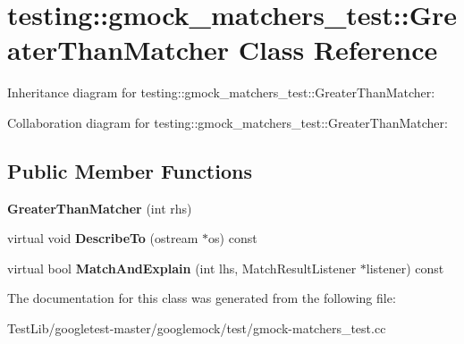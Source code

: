 \hypertarget{classtesting_1_1gmock__matchers__test_1_1GreaterThanMatcher}{}\section{testing\+:\+:gmock\+\_\+matchers\+\_\+test\+:\+:Greater\+Than\+Matcher Class Reference}
\label{classtesting_1_1gmock__matchers__test_1_1GreaterThanMatcher}


Inheritance diagram for testing\+:\+:gmock\+\_\+matchers\+\_\+test\+:\+:Greater\+Than\+Matcher\+:


Collaboration diagram for testing\+:\+:gmock\+\_\+matchers\+\_\+test\+:\+:Greater\+Than\+Matcher\+:
\subsection*{Public Member Functions}
\begin{DoxyCompactItemize}
\item 
\mbox{\label{classtesting_1_1gmock__matchers__test_1_1GreaterThanMatcher_a605c50137599a1dba0701bbd735bf1e8}} 
{\bfseries Greater\+Than\+Matcher} (int rhs)
\item 
\mbox{\label{classtesting_1_1gmock__matchers__test_1_1GreaterThanMatcher_a49ea904382d0f5b80ccf622423ab0d94}} 
virtual void {\bfseries Describe\+To} (ostream $\ast$os) const
\item 
\mbox{\label{classtesting_1_1gmock__matchers__test_1_1GreaterThanMatcher_a85a583852003638507d872238bcf7c0f}} 
virtual bool {\bfseries Match\+And\+Explain} (int lhs, Match\+Result\+Listener $\ast$listener) const
\end{DoxyCompactItemize}


The documentation for this class was generated from the following file\+:\begin{DoxyCompactItemize}
\item 
Test\+Lib/googletest-\/master/googlemock/test/gmock-\/matchers\+\_\+test.\+cc\end{DoxyCompactItemize}

